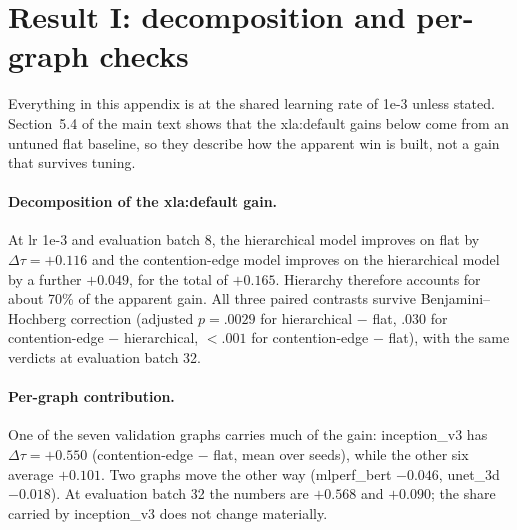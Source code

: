 \documentclass{article}
\begin{document}
\printAffiliationsAndNotice{}

\appendix
\section{Result I: decomposition and per-graph checks}
\label{app:result1}
Everything in this appendix is at the shared learning rate of 1e-3 unless stated. Section~5.4 of the main
text shows that the xla:default gains below come from an untuned flat baseline, so they describe how the
apparent win is built, not a gain that survives tuning.

\paragraph{Decomposition of the xla:default gain.} At lr 1e-3 and evaluation batch 8, the hierarchical
model improves on flat by $\Delta\tau = +0.116$ and the contention-edge model improves on the hierarchical
model by a further $+0.049$, for the total of $+0.165$. Hierarchy therefore accounts for about 70\% of the
apparent gain. All three paired contrasts survive Benjamini--Hochberg correction (adjusted $p = .0029$ for
hierarchical $-$ flat, $.030$ for contention-edge $-$ hierarchical, $< .001$ for contention-edge $-$ flat),
with the same verdicts at evaluation batch 32.

\paragraph{Per-graph contribution.} One of the seven validation graphs carries much of the gain:
inception\_v3 has $\Delta\tau = +0.550$ (contention-edge $-$ flat, mean over seeds), while the other six
average $+0.101$. Two graphs move the other way (mlperf\_bert $-0.046$, unet\_3d $-0.018$). At evaluation
batch 32 the numbers are $+0.568$ and $+0.090$; the share carried by inception\_v3 does not change
materially.
\end{document}
